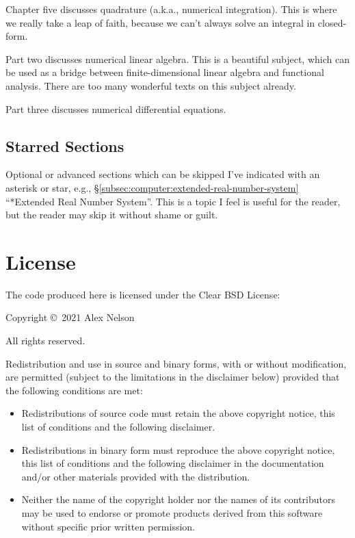 Chapter five discusses quadrature (a.k.a., numerical integration).
This is where we really take a leap of faith, because we can't always
solve an integral in closed-form.

\bigbreak
Part two discusses numerical linear algebra. This is a beautiful
subject, which can be used as a bridge between finite-dimensional linear
algebra and functional analysis. There are too many wonderful texts on
this subject already.

\bigbreak
Part three discusses numerical differential equations.

\subsection*{Starred Sections}

Optional or advanced sections which can be skipped I've indicated with
an asterisk or star, e.g.,
\S\ref{subsec:computer:extended-real-number-system} ``*Extended Real
Number System''. This is a topic I feel is useful for the reader, but
the reader may skip it without shame or guilt.

\section*{License}

The code produced here is licensed under the Clear BSD License:

\bigskip

Copyright \copyright\ 2021 Alex Nelson

All rights reserved.

Redistribution and use in source and binary forms, with or without
modification, are permitted (subject to the limitations in the
disclaimer below) provided that the following conditions are met:

\begin{itemize}
\item Redistributions of source code must retain the above copyright
     notice, this list of conditions and the following disclaimer.
\item Redistributions in binary form must reproduce the above copyright
     notice, this list of conditions and the following disclaimer in the
     documentation and/or other materials provided with the
     distribution.
\item Neither the name of the copyright holder nor the names of its
     contributors may be used to endorse or promote products derived
     from this software without specific prior written permission.
\end{itemize}

